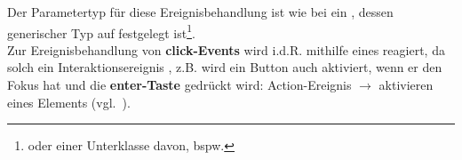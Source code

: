 \noindent
Der Parametertyp für diese Ereignisbehandlung ist wie bei  ein , dessen generischer Typ auf  festgelegt ist\footnote{
    oder einer Unterklasse davon, bspw. 
}.\\

\noindent
Zur Ereignisbehandlung von \textbf{click-Events} wird i.d.R. mithilfe eines  reagiert, da solch ein Interaktionsereignis , z.B. wird ein Button auch aktiviert, wenn er den Fokus hat und die \textbf{enter-Taste} gedrückt wird:  Action-Ereignis $\rightarrow$ aktivieren eines Elements (vgl.~\cite[220]{Oec22}).


